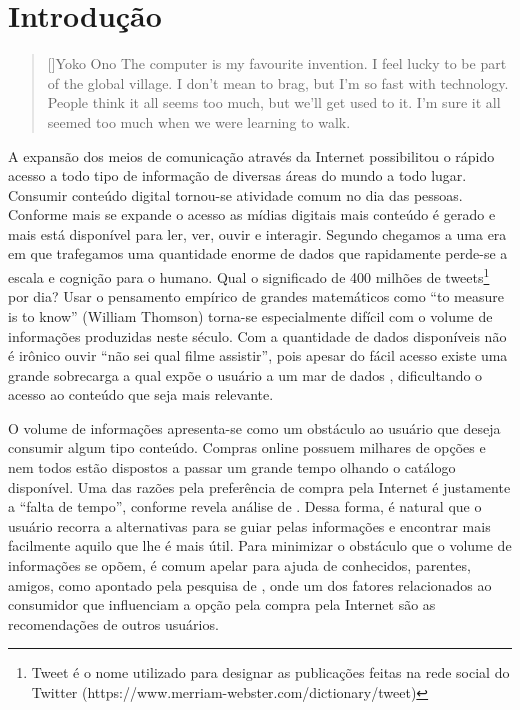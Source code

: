 \label{cap:introducao}
\chapter{Introdução}

\begin{quotation}[]{Yoko Ono}
The computer is my favourite invention. I feel lucky to be part of the global village. I don't mean to brag, but I'm so fast with technology. People think it all seems too much, but we'll get used to it. I'm sure it all seemed too much when we were learning to walk.
\end{quotation}

A expansão dos meios de comunicação através da Internet possibilitou o rápido acesso a todo tipo de informação de diversas áreas do mundo a todo lugar. Consumir conteúdo digital tornou-se atividade comum no dia das pessoas. Conforme mais se expande o acesso as mídias digitais mais conteúdo é gerado e mais está disponível para ler, ver, ouvir e interagir. Segundo \cite{Walker:2014} chegamos a uma era em que trafegamos uma quantidade enorme de dados que rapidamente perde-se a escala e cognição para o humano. Qual o significado de 400 milhões de tweets\footnote{Tweet é o nome utilizado para designar as publicações feitas na rede social do Twitter (https://www.merriam-webster.com/dictionary/tweet)} por dia? Usar o pensamento empírico de grandes matemáticos como “to measure is to know” (William Thomson) torna-se especialmente difícil com o volume de informações produzidas neste século. Com a quantidade de dados disponíveis não é irônico ouvir “não sei qual filme assistir”, pois apesar do fácil acesso existe uma grande sobrecarga a qual expõe o usuário a um mar de dados \citep{Wellman:BigData}, dificultando o acesso ao conteúdo que seja mais relevante.

O volume de informações apresenta-se como um obstáculo ao usuário que deseja consumir algum tipo conteúdo. Compras online possuem milhares de opções e nem todos estão dispostos a passar um grande tempo olhando o catálogo disponível. Uma das razões pela preferência de compra pela Internet é justamente a “falta de tempo”, conforme revela análise de \cite{Mykolas:2015a}. Dessa forma, é natural que o usuário recorra a alternativas para se guiar pelas informações e encontrar mais facilmente aquilo que lhe é mais útil. Para minimizar o obstáculo que o volume de informações se opõem, é comum apelar para ajuda de conhecidos, parentes, amigos, como apontado pela pesquisa de \cite{Mykolas:2015a}, onde um dos fatores relacionados ao consumidor que influenciam a opção pela compra pela Internet são as recomendações de outros usuários.

